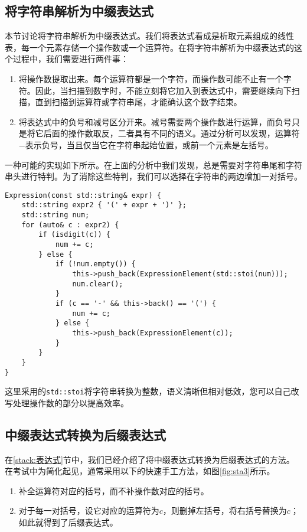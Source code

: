 \subsection{将字符串解析为中缀表达式}

本节讨论将字符串解析为中缀表达式。我们将表达式看成是析取元素组成的线性表，每一个元素存储一个操作数或一个运算符。在将字符串解析为中缀表达式的这个过程中，我们需要进行两件事：

\begin{enumerate}
    \item 将操作数提取出来。每个运算符都是一个字符，而操作数可能不止有一个字符。因此，当扫描到数字时，不能立刻将它加入到表达式中，需要继续向下扫描，直到扫描到运算符或字符串尾，才能确认这个数字结束。
    \item 将表达式中的负号和减号区分开来。减号需要两个操作数进行运算，而负号只是将它后面的操作数取反，二者具有不同的语义。通过分析可以发现，运算符$-$表示负号，当且仅当它在字符串起始位置，或前一个元素是左括号。
\end{enumerate}

一种可能的实现如下所示。在上面的分析中我们发现，总是需要对字符串尾和字符串头进行特判。为了消除这些特判，我们可以选择在字符串的两边增加一对括号。

\begin{lstlisting}
Expression(const std::string& expr) {
    std::string expr2 { '(' + expr + ')' };
    std::string num;
    for (auto& c : expr2) {
        if (isdigit(c)) {
            num += c;
        } else {
            if (!num.empty()) {
                this->push_back(ExpressionElement(std::stoi(num)));
                num.clear();
            }
            if (c == '-' && this->back() == '(') {
                num += c;
            } else {
                this->push_back(ExpressionElement(c));
            }
        }
    }
}
\end{lstlisting}

这里采用的\lstinline{std::stoi}将字符串转换为整数，语义清晰但相对低效，您可以自己改写处理操作数的部分以提高效率。

\subsection{中缀表达式转换为后缀表达式}

在\ref{stack:表达式}节中，我们已经介绍了将中缀表达式转换为后缀表达式的方法。在考试中为简化起见，通常采用以下的快速手工方法，如图\ref{fig:sta3}所示。
\begin{enumerate}
    \item 补全运算符对应的括号，而不补操作数对应的括号。
    \item 对于每一对括号，设它对应的运算符为$c$，则删掉左括号，将右括号替换为$c$；如此就得到了后缀表达式。
\end{enumerate}


